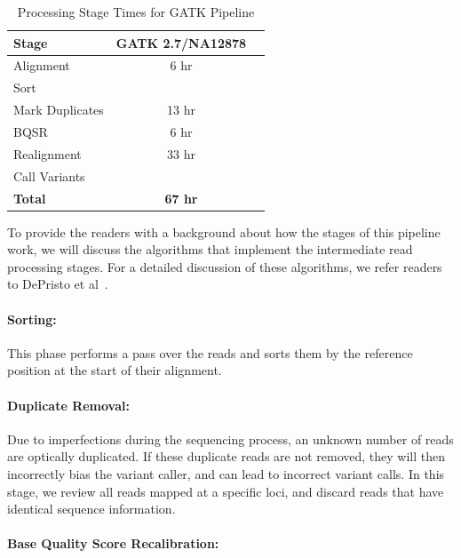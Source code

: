 \documentclass[10pt,twocolumn]{article}
\begin{document}
\begin{table}[h]
\caption{Processing Stage Times for GATK Pipeline}
\label{tab:stage-time}
\begin{center}
\begin{tabular}{| l | c | c |}
\hline
\bf Stage & \bf GATK 2.7/NA12878 \\
\hline
Alignment & 6 hr \\
Sort & \\
Mark Duplicates & 13 hr \\
BQSR & 6 hr \\
Realignment & 33 hr \\
Call Variants & \\
\bf Total & \bf 67 hr \\
\hline
\end{tabular}
\end{center}
\end{table}

To provide the readers with a background about how the stages of this pipeline work, we will discuss the algorithms that
implement the intermediate read processing stages. For a detailed discussion of these algorithms, we refer readers to DePristo
et al~\cite{depristo11}.

\paragraph{Sorting:}
\label{sec:sorting}

This phase performs a pass over the reads and sorts them by the reference position at the start of their alignment.

\paragraph{Duplicate Removal:} 
\label{sec:duplicate-removal}

Due to imperfections during the sequencing process, an unknown number of reads are optically duplicated. If these duplicate
reads are not removed, they will then incorrectly bias the variant caller, and can lead to incorrect variant calls. In this stage, we
review all reads mapped at a specific loci, and discard reads that have identical sequence information.

\paragraph{Base Quality Score Recalibration:} 
\label{sec:bqsr}
\end{document}
